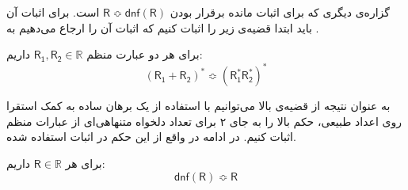گزاره‌ی دیگری که برای اثبات مانده برقرار بودن 
$\mathsf{R \Bumpeq dnf(R) }$
است. برای اثبات آن باید ابتدا قضیه‌ی زیر را اثبات کنیم که اثبات آن را ارجاع می‌دهیم به \cite{ullman}. 
\begin{thm}
	برای هر دو عبارت منظم 
	$\mathsf{R_1 , R_2} \in \mathbb{R}$
	داریم:
	$$\mathsf{(R_1 + R_2)^* \Bumpeq (R_1^* R_2^*)^*}$$
\end{thm} 

به عنوان نتیجه از قضیه‌ی بالا می‌توانیم با استفاده از یک برهان ساده به کمک استقرا روی اعداد طبیعی، حکم بالا را به جای ۲ برای تعداد دلخواه متنهاهی‌ای از عبارات منظم اثبات کنیم. در ادامه در واقع از این حکم در اثبات استفاده شده.

\begin{thm}
	برای هر
	$\mathsf{R} \in \mathbb{R}$ 
	داریم:
	$$\mathsf{dnf(R) \Bumpeq R}$$
\end{thm}

